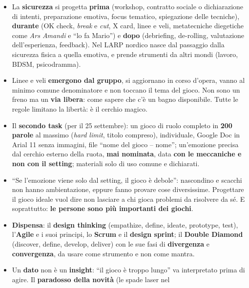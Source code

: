 \begin{itemize}
        lasciano vuoti da riempire con il personale. Può far male; le emozioni non si
        fermano a fine partita; provarlo non è segno di debolezza.
  \item La \textbf{sicurezza} si progetta \textbf{prima} (workshop, contratto sociale o
        dichiarazione di intenti, preparazione emotiva, focus tematico, spiegazione delle
        tecniche), \textbf{durante} (OK check, \emph{break} e \emph{cut}, X card, linee e
        veli, metatecniche diegetiche come \emph{Ars Amandi} e ``lo fa Mario'') e
        \textbf{dopo} (debriefing, de-rolling, valutazione dell'esperienza, feedback). Nel
        LARP nordico nasce dal passaggio dalla sicurezza fisica a quella emotiva, e prende
        strumenti da altri mondi (lavoro, BDSM, psicodramma).
  \item Linee e veli \textbf{emergono dal gruppo}, si aggiornano in corso d'opera, vanno al
        minimo comune denominatore e non toccano il tema del gioco. Non sono un freno ma
        un \textbf{via libera}: come sapere che c'è un bagno disponibile. Tutte le regole
        limitano la libertà: è il cerchio magico.
  \item Il \textbf{secondo task} (per il 25 settembre): un gioco di ruolo completo in
        \textbf{200 parole} al massimo (\emph{hard limit}, titolo compreso), individuale,
        Google Doc in Arial 11 senza immagini, file ``nome del gioco -- nome''; un'emozione
        precisa dal cerchio esterno della ruota, \textbf{mai nominata}, data \textbf{con le
        meccaniche e non con il setting}; materiali solo di uso comune e dichiarati.
  \item ``Se l'emozione viene solo dal setting, il gioco è debole'': nascondino e scacchi
        non hanno ambientazione, eppure fanno provare cose diversissime. Progettare il
        gioco ideale vuol dire non lasciare a chi gioca problemi da risolvere da sé. E
        soprattutto: \textbf{le persone sono più importanti dei giochi}.
  \item \textbf{Dispensa}: il \textbf{design thinking} (empathize, define, ideate,
        prototype, test), l'\textbf{Agile} e i suoi principi, lo \textbf{Scrum} e il
        \textbf{design sprint}; il \textbf{Double Diamond} (discover, define, develop,
        deliver) con le sue fasi di \textbf{divergenza} e \textbf{convergenza}, da usare
        come strumento e non come mantra.
  \item Un \textbf{dato} non è un \textbf{insight}: ``il gioco è troppo lungo'' va
        interpretato prima di agire. Il \textbf{paradosso della novità} (le spade laser nel

\end{itemize}
